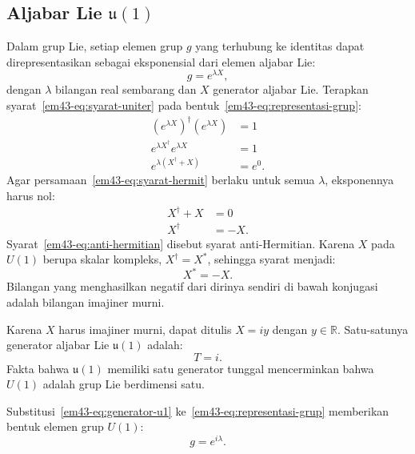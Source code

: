 \subsection{Aljabar Lie $\mathfrak{u}(1)$}

Dalam grup Lie, setiap elemen grup $g$ yang terhubung ke identitas dapat direpresentasikan sebagai eksponensial dari elemen aljabar Lie:
\begin{equation}\label{em43-eq:representasi-grup}
  g= e^{\lambda X},
\end{equation}
dengan $\lambda$ bilangan real sembarang dan $X$ generator aljabar Lie. Terapkan syarat~\eqref{em43-eq:syarat-uniter} pada bentuk~\eqref{em43-eq:representasi-grup}:
  \begin{align}
    (e^{\lambda X})^\dagger (e^{\lambda X})&=1 \nonumber\\
    e^{\lambda X^\dagger}e^{\lambda X} &= 1 \nonumber\\
    e^{\lambda( X^\dagger + X)} &= e^0. \label{em43-eq:syarat-hermit}
  \end{align}
Agar persamaan~\eqref{em43-eq:syarat-hermit} berlaku untuk semua $\lambda$, eksponennya harus nol:
\begin{align}
  X^\dagger + X &= 0 \nonumber \\
  X^\dagger &= -X. \label{em43-eq:anti-hermitian}
\end{align}
Syarat~\eqref{em43-eq:anti-hermitian} disebut syarat anti-Hermitian. Karena $X$ pada $U(1)$ berupa skalar kompleks, $X^\dagger=X^*$, sehingga syarat menjadi:
\begin{equation}\label{em43-eq:anti-hermitian-2}
  X^*=-X.
\end{equation}
Bilangan yang menghasilkan negatif dari dirinya sendiri di bawah konjugasi adalah bilangan imajiner murni.

Karena $X$ harus imajiner murni, dapat ditulis $X=iy$ dengan $y \in \mathbb{R}$. Satu-satunya generator aljabar Lie $\mathfrak{u}(1)$ adalah:
\begin{equation}\label{em43-eq:generator-u1}
  T=i.
\end{equation}
Fakta bahwa $\mathfrak{u}(1)$ memiliki satu generator tunggal mencerminkan bahwa $U(1)$ adalah grup Lie berdimensi satu.

Substitusi~\eqref{em43-eq:generator-u1} ke~\eqref{em43-eq:representasi-grup} memberikan bentuk elemen grup $U(1)$:
\begin{equation}\label{em43-eq:representasi-baru}
  g=e^{i\lambda}.
\end{equation}

